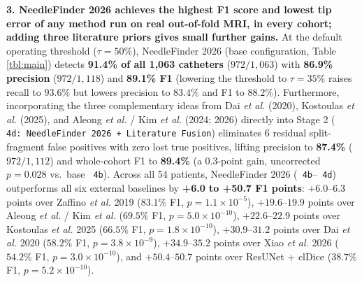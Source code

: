 \documentclass[
  11pt,
]{article}
\let\nforigtexttt\texttt
\renewcommand{\texttt}[1]{\nforigtexttt{\XeTeXinterchartokenstate=1 #1}}
\begin{document}
\textbf{3. NeedleFinder 2026 achieves the highest F1 score and lowest
tip error of any method run on real out-of-fold MRI, in every cohort;
adding three literature priors gives small further gains.} At the
default operating threshold (\(\tau = 50\%\)), NeedleFinder 2026 (base
configuration, Table \ref{tbl:main}) detects \textbf{91.4\% of all 1,063
catheters} (\(972/1,063\)) with \textbf{86.9\% precision}
(\(972/1,118\)) and \textbf{89.1\% F1} (lowering the threshold to
\(\tau = 35\%\) raises recall to \(93.6\%\) but lowers precision to
\(83.4\%\) and F1 to \(88.2\%\)). Furthermore, incorporating the three
complementary ideas from Dai \emph{et al.} (2020), Kostoulas \emph{et
al.} (2025), and Aleong \emph{et al.} / Kim \emph{et al.} (2024; 2026)
directly into Stage 2
(\texttt{4d:\ NeedleFinder\ 2026\ +\ Literature\ Fusion}) eliminates 6
residual split-fragment false positives with zero lost true positives,
lifting precision to \textbf{87.4\%} (\(972/1,112\)) and whole-cohort F1
to \textbf{89.4\%} (a 0.3-point gain, uncorrected \(p = 0.028\) vs.~base
\texttt{4b}). Across all 54 patients, NeedleFinder 2026
(\texttt{4b}--\texttt{4d}) outperforms all six external baselines by
\textbf{+6.0 to +50.7 F1 points}: \(+6.0\text{--}6.3\) points over
Zaffino \emph{et al.} 2019 (\(83.1\%\) F1, \(p = 1.1 \times 10^{-5}\)),
\(+19.6\text{--}19.9\) points over Aleong \emph{et al.} / Kim \emph{et
al.} (\(69.5\%\) F1, \(p = 5.0 \times 10^{-10}\)),
\(+22.6\text{--}22.9\) points over Kostoulas \emph{et al.} 2025
(\(66.5\%\) F1, \(p = 1.8 \times 10^{-10}\)), \(+30.9\text{--}31.2\)
points over Dai \emph{et al.} 2020 (\(58.2\%\) F1,
\(p = 3.8 \times 10^{-9}\)), \(+34.9\text{--}35.2\) points over Xiao
\emph{et al.} 2026 (\(54.2\%\) F1, \(p = 3.0 \times 10^{-10}\)), and
\(+50.4\text{--}50.7\) points over ResUNet + clDice (\(38.7\%\) F1,
\(p = 5.2 \times 10^{-10}\)).
\end{document}
